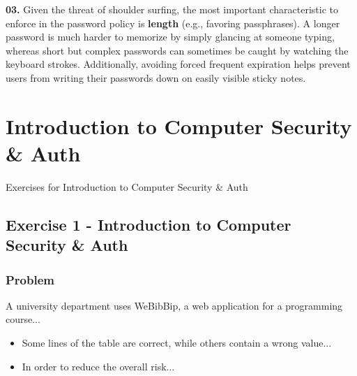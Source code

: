 \documentclass{article}
\begin{document}
\textbf{03.} Given the threat of shoulder surfing, the most important characteristic to enforce in the password policy is \textbf{length} (e.g., favoring passphrases). A longer password is much harder to memorize by simply glancing at someone typing, whereas short but complex passwords can sometimes be caught by watching the keyboard strokes. Additionally, avoiding forced frequent expiration helps prevent users from writing their passwords down on easily visible sticky notes.


\section{Introduction to Computer Security \& Auth}
Exercises for Introduction to Computer Security \& Auth

\subsection{Exercise 1 - Introduction to Computer Security \& Auth}
\subsubsection*{Problem}
A university department uses WeBibBip, a web application for a programming course...
\begin{itemize}
    \item[\textbf{1.1}] [3 points] Some lines of the table are correct, while others contain a wrong value...
    \item[\textbf{1.2}] [1 point] In order to reduce the overall risk...
\end{itemize}
\end{document}
